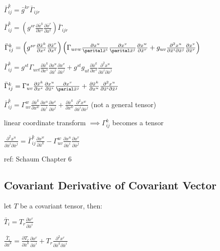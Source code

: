\documentclass[8pt,letter]{article}
\begin{document}
\begin{multicols*}{2}
  $\bar{\Gamma}_{ij}^k = \bar{g}^{kr} \bar{\Gamma}_{ijr}$

  $\bar{\Gamma}_{ij}^k = \left(g^{sr} \frac{\partial \bar{x}^k}{\partial x^s} \frac{\partial \bar{x}^r}{\partial x^t}\right) \bar{\Gamma}_{ijr}$

  $\bar{\Gamma}_{ij}^k = \left(g^{sr} \frac{\partial \bar{x}^k}{\partial x^s} \frac{\partial \bar{x}^r}{\partial x^t}\right) \left(\Gamma_{uvw} \frac{\partial x^u}{\parital \bar{x}^i} \frac{\partial x^v}{\parital \bar{x}^j} \frac{\partial x^w}{\partial \bar{x}^r} + g_{uv} \frac{\partial^2 x^u}{\partial \bar{x}^i \partial \bar{x}^j} \frac{\partial x^v}{\partial \bar{x}^r} \right)$

  $\bar{\Gamma}_{ij}^k = g^{st} \Gamma_{uvt} \frac{\partial \bar{x}^k}{\partial x^s} \frac{\partial x^u}{\partial \bar{x}^i} \frac{\partial x^v}{\partial \bar{x}^j} + g^{st} g_{ut} \frac{\partial \bar{x}^k}{\partial x^s} \frac{\partial^2 x^u}{\partial \bar{x}^i \partial \bar{x}^j}$

  $\bar{\Gamma}_{ij}^k = \Gamma_{uv}^s \frac{\partial \bar{x}^k}{\partial x^s} \frac{\partial x^u}{\partial \bar{x}^i} \frac{\partial x^v}{\parial \bar{x}^j} + \frac{\partial \bar{x}^k}{\partial x^u} \frac{\partial^2 x^u}{\partial \bar{x}^i \partial \bar{x}^j}$

  $\bar{\Gamma}_{ij}^k = \Gamma_{uv}^w \frac{\partial \bar{x}^k}{\partial x^w} \frac{\partial x^u}{\partial \bar{x}^i} \frac{\partial x^v}{\partial \bar{x}^j} + \frac{\partial \bar{x}^k}{\partial x^w} \frac{\partial^2 x^w}{\partial \bar{x}^i \partial \bar{x}^j}$ (not a general tensor)

  linear coordinate transform $\implies \Gamma_{ij}^k$ becomes a tensor

  $\frac{\partial^2 x^u}{\partial \bar{x}^i \partial \bar{x}^j} = \bar{\Gamma}_{ij}^k \frac{\partial x^w}{\partial \bar{x}^k} - \Gamma_{uv}^w \frac{\partial x^u}{\partial \bar{x}^i} \frac{\partial x^v}{\partial \bar{x}^j}$

  ref: Schaum Chapter 6
  
  \subsection{Covariant Derivative of Covariant Vector}

  let $T$ be a covariant tensor, then:

  $\bar{T}_i = T_r \frac{\partial x^r}{\partial \bar{x}^i}$

  $\frac{\bar{T}_i}{\partial \bar{x}^k} = \frac{\partial T_r}{\partial \bar{x}^k} \frac{\partial x^r}{\partial \bar{x}^i} + T_r \frac{\partial^2 x^r}{\partial \bar{x}^k \partial \bar{x}^i}$


\end{multicols*}
\end{document}
